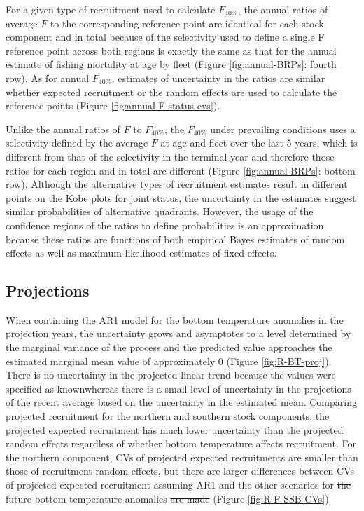\documentclass[
]{article}
\makeatletter
\providecommand{\DIFaddtex}[1]{{\protect\color{blue}\uwave{#1}}} %
\providecommand{\DIFdeltex}[1]{{\protect\color{red}\sout{#1}}} %
\providecommand{\DIFaddbegin}{} %
\providecommand{\DIFaddend}{} %
\providecommand{\DIFdelbegin}{} %
\providecommand{\DIFdelend}{} %
\providecommand{\DIFadd}[1]{\texorpdfstring{\DIFaddtex{#1}}{#1}} %
\providecommand{\DIFdel}[1]{\texorpdfstring{\DIFdeltex{#1}}{}} %
\newcommand{\DIFscaledelfig}{0.5}
\newlength{\DIFdelgraphicswidth} %
\newlength{\DIFdelgraphicsheight} %
\newcommand{\DIFaddincludegraphics}[2][]{{\color{blue}\fbox{\DIFOincludegraphics[#1]{#2}}}} %
\newcommand{\DIFdelincludegraphics}[2][]{%
\sbox{\DIFdelgraphicsbox}{\DIFOincludegraphics[#1]{#2}}%
\settoboxwidth{\DIFdelgraphicswidth}{\DIFdelgraphicsbox} %
\settoboxtotalheight{\DIFdelgraphicsheight}{\DIFdelgraphicsbox} %
\scalebox{\DIFscaledelfig}{%
\parbox[b]{\DIFdelgraphicswidth}{\usebox{\DIFdelgraphicsbox}\\[-\baselineskip] \rule{\DIFdelgraphicswidth}{0em}}\llap{\resizebox{\DIFdelgraphicswidth}{\DIFdelgraphicsheight}{%
\setlength{\unitlength}{\DIFdelgraphicswidth}%
\begin{picture}(1,1)%
\thicklines\linethickness{2pt} %
{\color[rgb]{1,0,0}\put(0,0){\framebox(1,1){}}}%
{\color[rgb]{1,0,0}\put(0,0){\line( 1,1){1}}}%
{\color[rgb]{1,0,0}\put(0,1){\line(1,-1){1}}}%
\end{picture}%
}\hspace*{3pt}}} %
} %
\DeclareRobustCommand{\DIFaddbegin}{\DIFOaddbegin \let\includegraphics\DIFaddincludegraphics} %
\DeclareRobustCommand{\DIFaddend}{\DIFOaddend \let\includegraphics\DIFOincludegraphics} %
\DeclareRobustCommand{\DIFdelbegin}{\DIFOdelbegin \let\includegraphics\DIFdelincludegraphics} %
\DeclareRobustCommand{\DIFdelend}{\DIFOaddend \let\includegraphics\DIFOincludegraphics} %
\let\sout@orig\sout %
\renewcommand{\sout}[1]{\ifmmode\text{\sout@orig{\ensuremath{#1}}}\else\sout@orig{#1}\fi} %
\makeatother
\begin{document}
For a given type of recruitment used to calculate \(F_{40\%}\), the annual ratios of average \(F\) to the corresponding reference point are identical for each stock component and in total because of the selectivity used to define a single F reference point across both regions is exactly the same as that for the annual estimate of fishing mortality at age by fleet (Figure \ref{fig:annual-BRPs}: fourth row). As for annual \(F_{40\%}\), estimates of uncertainty in the ratios are similar whether expected recruitment or the random effects are used to calculate the reference points (Figure \ref{fig:annual-F-status-cvs}).

Unlike the annual ratios of \(F\) to \(F_{40\%}\), the \(F_{40\%}\) under prevailing conditions uses a selectivity defined by the average \(F\) at age and fleet over the last 5 years, which is different from that of the selectivity in the terminal year and therefore those ratios for each region and in total are different (Figure \ref{fig:annual-BRPs}: bottom row). Although the alternative types of recruitment estimates result in different points on the Kobe plots for joint status, the uncertainty in the estimates suggest similar probabilities of alternative quadrants. However, the usage of the confidence regions of the ratios to define probabilities is an approximation because these ratios are functions of both empirical Bayes estimates of random effects as well as maximum likelihood estimates of fixed effects.

\hypertarget{projections-1}{%
\subsection*{Projections}\label{projections-1}}

When continuing the AR1 model for the bottom temperature anomalies in the projection years, the uncertainty grows and asymptotes to a level determined by the marginal variance of the process and the predicted value approaches the estimated marginal mean value of approximately 0 (Figure \ref{fig:R-BT-proj}). There is no uncertainty in the projected linear trend because the values were specified as known\DIFaddbegin \DIFadd{, }\DIFaddend whereas there is a small level of uncertainty in the projections of the recent average based on the uncertainty in the estimated mean. Comparing projected recruitment for the northern and southern stock components, the projected expected recruitment has much lower uncertainty than the projected random effects regardless of whether bottom temperature affects recruitment. For the northern component, CVs of projected expected recruitments are smaller than those of recruitment random effects, but there are larger differences between CVs of projected expected recruitment assuming AR1 and the other scenarios for \DIFdelbegin \DIFdel{the }\DIFdelend future bottom temperature anomalies \DIFdelbegin \DIFdel{are made }\DIFdelend (Figure \ref{fig:R-F-SSB-CVs}).
\end{document}

